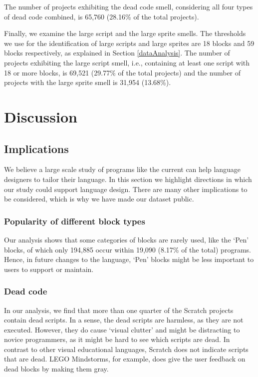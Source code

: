 \documentclass{sig-alternate-05-2015}
\begin{document}
The number of projects exhibiting the dead code smell, considering all four types of dead code combined, is 65,760 (28.16\% of the total projects).

Finally, we examine the large script and the large sprite smells. The thresholds we use for the identification of large scripts and large sprites are 18 blocks and 59 blocks respectively, as explained in Section \ref{dataAnalysis}. The number of projects exhibiting the large script smell, i.e., containing at least one script with 18 or more blocks, is 69,521 (29.77\% of the total projects) and the number of projects with the large sprite smell is 31,954 (13.68\%).

\noindent
{}

\section{Discussion}
\label{sec:discussion}
\subsection{Implications}
We believe a large scale study of programs like the current can help language designers to tailor their language. In this section we highlight directions in which our study could support language design. There are many other implications to be considered, which is why we have made our dataset public.

\subsubsection{Popularity of different block types}
Our analysis shows that some categories of blocks are rarely used, like the `Pen' blocks, of which only 194,885 occur within 19,090 (8.17\% of the total) programs. Hence, in future changes to the language, `Pen' blocks might be less important to users to support or maintain. 

\subsubsection{Dead code}
In our analysis, we find that more than one quarter of the Scratch projects contain dead scripts. In a sense, the dead scripts are harmless, as they are not executed. However, they do cause `visual clutter' and might be distracting to novice programmers, as it might be hard to see which scripts are dead. In contrast to other visual educational languages, Scratch does not indicate scripts that are dead. LEGO Mindstorms, for example, does give the user feedback on dead blocks by making them gray. 
\end{document}
